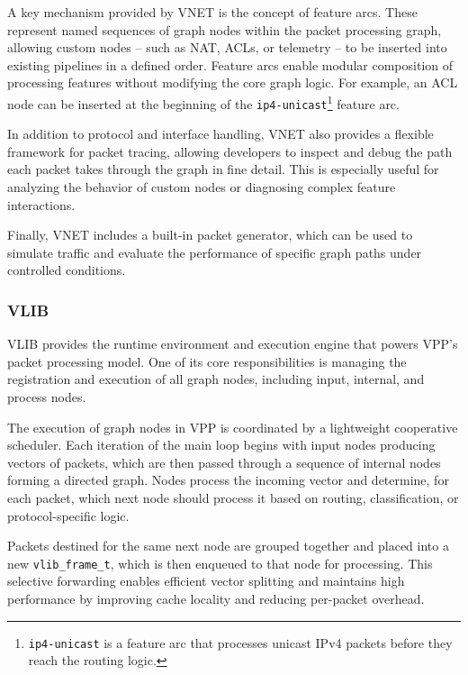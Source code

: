 A key mechanism provided by VNET is the concept of feature arcs. 
These represent named sequences of graph nodes within the packet processing graph, allowing custom nodes -- such as NAT, ACLs, or telemetry -- to be inserted into existing pipelines in a defined order. 
Feature arcs enable modular composition of processing features without modifying the core graph logic. For example, an ACL node can be inserted at the beginning of the 
\texttt{ip4-unicast}\footnote{\texttt{ip4-unicast} is a feature arc that processes unicast IPv4 packets before they reach the routing logic.} feature arc.

In addition to protocol and interface handling, VNET also provides a flexible framework for packet tracing, 
allowing developers to inspect and debug the path each packet takes through the graph in fine detail. 
This is especially useful for analyzing the behavior of custom nodes or diagnosing complex feature interactions.

Finally, VNET includes a built-in packet generator, which can be used to simulate traffic and evaluate the performance of specific graph paths under 
controlled conditions.\cite{fdio-vpp-vnet-2506, fdio-vpp-featurearcs-2506}

\subsubsection{VLIB}
VLIB provides the runtime environment and execution engine that powers VPP’s packet processing model.
One of its core responsibilities is managing the registration and execution of all graph nodes, including input, internal, and process nodes.

The execution of graph nodes in VPP is coordinated by a lightweight cooperative scheduler.
Each iteration of the main loop begins with input nodes producing vectors of packets, which are then passed through a sequence of internal nodes forming a directed graph.
Nodes process the incoming vector and determine, for each packet, which next node should process it based on routing, classification, or protocol-specific logic.

Packets destined for the same next node are grouped together and placed into a new \texttt{vlib\_frame\_t}, which is then enqueued to that node for processing.
This selective forwarding enables efficient vector splitting and maintains high performance by improving cache locality and reducing per-packet overhead.

